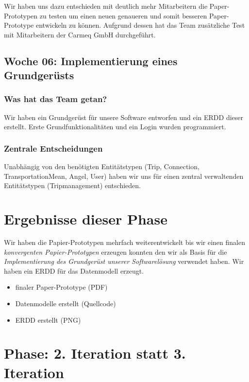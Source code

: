 \documentclass{article}
\begin{document}
Wir haben uns dazu entschieden mit deutlich mehr Mitarbeitern die Paper-Prototypen zu testen um einen neuen genaueren und somit besseren Paper-Prototype entwickeln zu k\"onnen. Aufgrund dessen hat das Team zus\"atzliche Test mit Mitarbeitern der Carmeq GmbH durchgef\"uhrt.

\subsection{Woche 06: Implementierung eines Grundger\"usts}

\subsubsection{Was hat das Team getan?}

Wir haben ein Grundger\"ust f\"ur unsere Software entworfen und ein ERDD dieser erstellt. Erste Grundfunktionalit\"aten und ein Login wurden programmiert.

\subsubsection{Zentrale Entscheidungen}

Unabh\"angig von den ben\"otigten Entit\"atstypen (Trip, Connection, TransportationMean, Angel, User) haben wir uns f\"ur einen zentral verwaltenden Entit\"atstypen (Tripmanagement) entschieden.

\section*{Ergebnisse dieser Phase}

Wir haben die Papier-Prototypen mehrfach weiterentwickelt bis wir einen finalen \textit{konvergenten Papier-Prototypen} erzeugen konnten den wir als Basis f\"ur die \textit{Implementierung des Grundger\"ust unserer Softwarel\"osung} verwendet haben. Wir haben ein ERDD f\"ur das Datenmodell erzeugt.

\begin{itemize}
\item finaler Paper-Prototype (PDF)
\item Datenmodelle erstellt (Quellcode)
\item ERDD erstellt (PNG)
\end{itemize}

\section{Phase: 2. Iteration statt 3. Iteration}
\end{document}
